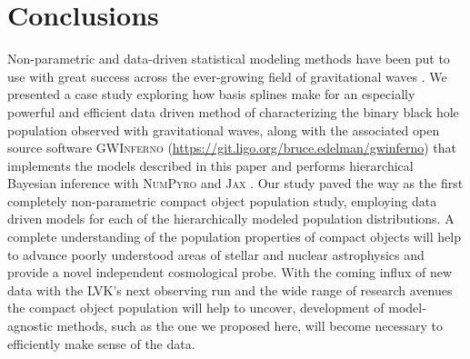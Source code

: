 \section{Conclusions}\label{sec:conclusion}

Non-parametric and data-driven statistical modeling methods have been put to use with great success across the ever-growing field of gravitational 
waves \citep{B_Farr_etal_2014,Littenberg_2015,Mandel_2016,Edwards_2018,Doctor_GPR,Edelman_2021,Vitale_2021,Tiwari_2021_a,Tiwari_2021_b,Edelman_2022ApJ,Tiwari_2022ApJ}. 
We presented a case study exploring how basis splines make for an especially powerful and efficient data driven method of characterizing the binary black hole population observed 
with gravitational waves, along with the associated open source software \textsc{GWInferno} (\url{https://git.ligo.org/bruce.edelman/gwinferno}) that implements the models 
described in this paper and performs hierarchical Bayesian inference with \textsc{NumPyro} and \textsc{Jax} \citep{pyro,numpyro,jax}. 
Our study paved the way as the first completely non-parametric compact object population study, employing data driven models for each of the hierarchically 
modeled population distributions. A complete understanding of the population properties of compact objects will help to advance poorly understood areas of stellar and 
nuclear astrophysics and provide a novel independent cosmological probe. With the coming influx of new data with the LVK's next observing run and the wide 
range of research avenues the compact object population will help to uncover, development of model-agnostic methods, such as the one we proposed here, will become necessary to efficiently make
sense of the data.